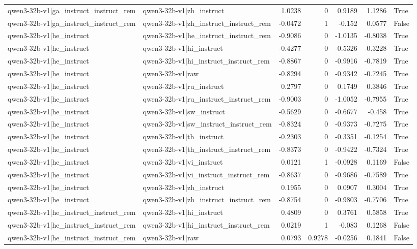 \begin{table}
\begin{tabular}{l l r r r r l}
qwen3-32b-v1|ga_instruct_instruct_rem & qwen3-32b-v1|zh_instruct & 1.0238 & 0 & 0.9189 & 1.1286 & True \\
qwen3-32b-v1|ga_instruct_instruct_rem & qwen3-32b-v1|zh_instruct_instruct_rem & -0.0472 & 1 & -0.152 & 0.0577 & False \\
qwen3-32b-v1|he_instruct & qwen3-32b-v1|he_instruct_instruct_rem & -0.9086 & 0 & -1.0135 & -0.8038 & True \\
qwen3-32b-v1|he_instruct & qwen3-32b-v1|hi_instruct & -0.4277 & 0 & -0.5326 & -0.3228 & True \\
qwen3-32b-v1|he_instruct & qwen3-32b-v1|hi_instruct_instruct_rem & -0.8867 & 0 & -0.9916 & -0.7819 & True \\
qwen3-32b-v1|he_instruct & qwen3-32b-v1|raw & -0.8294 & 0 & -0.9342 & -0.7245 & True \\
qwen3-32b-v1|he_instruct & qwen3-32b-v1|ru_instruct & 0.2797 & 0 & 0.1749 & 0.3846 & True \\
qwen3-32b-v1|he_instruct & qwen3-32b-v1|ru_instruct_instruct_rem & -0.9003 & 0 & -1.0052 & -0.7955 & True \\
qwen3-32b-v1|he_instruct & qwen3-32b-v1|sw_instruct & -0.5629 & 0 & -0.6677 & -0.458 & True \\
qwen3-32b-v1|he_instruct & qwen3-32b-v1|sw_instruct_instruct_rem & -0.8324 & 0 & -0.9373 & -0.7275 & True \\
qwen3-32b-v1|he_instruct & qwen3-32b-v1|th_instruct & -0.2303 & 0 & -0.3351 & -0.1254 & True \\
qwen3-32b-v1|he_instruct & qwen3-32b-v1|th_instruct_instruct_rem & -0.8373 & 0 & -0.9422 & -0.7324 & True \\
qwen3-32b-v1|he_instruct & qwen3-32b-v1|vi_instruct & 0.0121 & 1 & -0.0928 & 0.1169 & False \\
qwen3-32b-v1|he_instruct & qwen3-32b-v1|vi_instruct_instruct_rem & -0.8637 & 0 & -0.9686 & -0.7589 & True \\
qwen3-32b-v1|he_instruct & qwen3-32b-v1|zh_instruct & 0.1955 & 0 & 0.0907 & 0.3004 & True \\
qwen3-32b-v1|he_instruct & qwen3-32b-v1|zh_instruct_instruct_rem & -0.8754 & 0 & -0.9803 & -0.7706 & True \\
qwen3-32b-v1|he_instruct_instruct_rem & qwen3-32b-v1|hi_instruct & 0.4809 & 0 & 0.3761 & 0.5858 & True \\
qwen3-32b-v1|he_instruct_instruct_rem & qwen3-32b-v1|hi_instruct_instruct_rem & 0.0219 & 1 & -0.083 & 0.1268 & False \\
qwen3-32b-v1|he_instruct_instruct_rem & qwen3-32b-v1|raw & 0.0793 & 0.9278 & -0.0256 & 0.1841 & False \\

\end{tabular}
\end{table}
